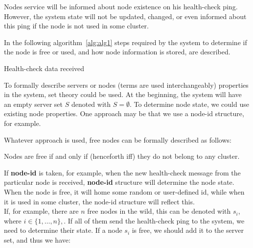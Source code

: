 \noindent
Nodes service will be informed about node existence on his health-check ping. However, the system state will not be updated, changed, or even informed about this ping if the node is not used in some cluster.

In the following algorithm~\ref{alg:alg1} steps required by the system to determine if the node is free or used, and how node information is stored, are described.

\begin{algorithm}[H]
	\SetAlgoLined
	\caption{Health-check data received}
	\label{alg:alg1}
\end{algorithm}

\noindent
To formally describe servers or nodes (terms are used interchangeably) properties in the system, set theory could be used. At the beginning, the system will have an empty server set $S$ denoted with $S=\emptyset$. To determine node state, we could use existing node properties. One approach may be that we use a node-id structure, for example. 

Whatever approach is used, free nodes can be formally described as follows:

\begin{definition}
	Nodes are free if and only if (henceforth iff) they do not belong to any cluster.
\end{definition}

\noindent 
If \textbf{node-id} is taken, for example, when the new health-check message from the particular node is received, \textbf{node-id} structure will determine the node state. When the node is free, it will home some random or user-defined id, while when it is used in some cluster, the node-id structure will reflect this.\\

If, for example, there are $n$ free nodes in the wild, this can be denoted with $s_i$, where $i\in\{1, \ldots, n\},$. If all of them send the health-check ping to the system, we need to determine their state. If a node $s_i$ is free, we should add it to the server set, and thus we have:

